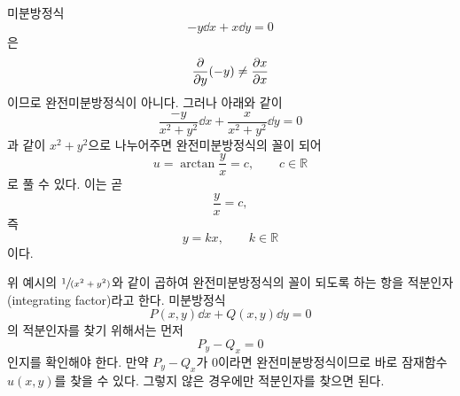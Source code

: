 \documentclass[../engineering_mathematics_lecture_note.tex]{subfiles}
\begin{document}
\begin{example}
    미분방정식
    \begin{equation*}
        -y \dd{x} + x \dd{y} = 0
    \end{equation*}
    은
    \begin{equation*}
        \pdv{y}(-y) \neq \pdv{x}{x}
    \end{equation*}
    이므로 완전미분방정식이 아니다.
    그러나 아래와 같이
    \begin{equation*}
        \frac{-y}{x^2 + y^2} \dd{x} + \frac{x}{x^2 + y^2} \dd{y} = 0
    \end{equation*}
    과 같이 $x^2 + y^2$으로 나누어주면 완전미분방정식의 꼴이 되어
    \begin{equation*}
        u = \arctan \frac yx = c, \qquad c \in \mathbb R
    \end{equation*}
    로 풀 수 있다.
    이는 곧
    \begin{equation*}
        \frac yx = c,
    \end{equation*}
    즉
    \begin{equation*}
        y = kx, \qquad k \in \mathbb R
    \end{equation*}
    이다.
\end{example}

위 예시의 $\sfrac{1}{(x^2 + y^2)}$와 같이 곱하여 완전미분방정식의 꼴이 되도록 하는 항을 적분인자(integrating factor)라고 한다.
미분방정식
\begin{equation*}
    P(x, y) \dd{x} + Q(x, y) \dd{y} = 0
\end{equation*}
의 적분인자를 찾기 위해서는 먼저
\begin{equation*}
    P_y - Q_x = 0
\end{equation*}
인지를 확인해야 한다.
만약 $P_y - Q_x$가 0이라면 완전미분방정식이므로 바로 잠재함수 $u(x, y)$를 찾을 수 있다.
그렇지 않은 경우에만 적분인자를 찾으면 된다.
\end{document}
